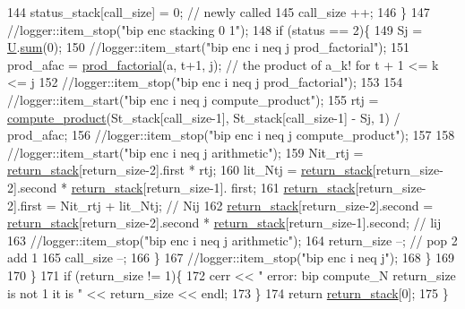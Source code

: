\begin{DoxyCode}
144         status\_stack[call\_size] = 0;  \textcolor{comment}{// newly called}
145         call\_size ++;
146       \}
147       \textcolor{comment}{//logger::item\_stop("bip enc stacking 0 1");}
148       \textcolor{keywordflow}{if} (status == 2)\{
149         Sj = \hyperlink{classb__graph__encoder_ac810138443002a2b2cf579ced2dc34ce}{U}.\hyperlink{classreverse__fenwick__tree_a672731fd6395b4853430073a099a80e6}{sum}(0);
150         \textcolor{comment}{//logger::item\_start("bip enc i neq j prod\_factorial");}
151         prod\_afac = \hyperlink{compression__helper_8cpp_a86d8a20e022dc06b23df3b08ac10b7d1}{prod\_factorial}(a, t+1, j); \textcolor{comment}{// the product of a\_k! for t + 1 <= k <= j}
152         \textcolor{comment}{//logger::item\_stop("bip enc i neq j prod\_factorial");}
153 
154         \textcolor{comment}{//logger::item\_start("bip enc i neq j compute\_product");}
155         rtj = \hyperlink{compression__helper_8cpp_ae2afb43aabe50f7d42aae8f82b5a35f4}{compute\_product}(St\_stack[call\_size-1], St\_stack[call\_size-1] - Sj, 1) / 
      prod\_afac;
156         \textcolor{comment}{//logger::item\_stop("bip enc i neq j compute\_product");}
157 
158         \textcolor{comment}{//logger::item\_start("bip enc i neq j arithmetic");}
159         Nit\_rtj = \hyperlink{namespacehelper__vars_a6d2100c373830cacd232319a9958652d}{return\_stack}[return\_size-2].first * rtj;
160         lit\_Ntj = \hyperlink{namespacehelper__vars_a6d2100c373830cacd232319a9958652d}{return\_stack}[return\_size-2].second * \hyperlink{namespacehelper__vars_a6d2100c373830cacd232319a9958652d}{return\_stack}[return\_size-1].
      first;
161         \hyperlink{namespacehelper__vars_a6d2100c373830cacd232319a9958652d}{return\_stack}[return\_size-2].first = Nit\_rtj + lit\_Ntj; \textcolor{comment}{// Nij}
162         \hyperlink{namespacehelper__vars_a6d2100c373830cacd232319a9958652d}{return\_stack}[return\_size-2].second = \hyperlink{namespacehelper__vars_a6d2100c373830cacd232319a9958652d}{return\_stack}[return\_size-2].second * 
      \hyperlink{namespacehelper__vars_a6d2100c373830cacd232319a9958652d}{return\_stack}[return\_size-1].second; \textcolor{comment}{// lij}
163         \textcolor{comment}{//logger::item\_stop("bip enc i neq j arithmetic");}
164         return\_size --; \textcolor{comment}{// pop 2 add 1}
165         call\_size --;
166       \}
167       \textcolor{comment}{//logger::item\_stop("bip enc i neq j");}
168     \}
169 
170   \}
171   \textcolor{keywordflow}{if} (return\_size != 1)\{
172     cerr << \textcolor{stringliteral}{" error: bip compute\_N return\_size is not 1 it is "} << return\_size << endl;
173   \}
174   \textcolor{keywordflow}{return} \hyperlink{namespacehelper__vars_a6d2100c373830cacd232319a9958652d}{return\_stack}[0];
175 \}
\end{DoxyCode}
\mbox{\label{classb__graph__encoder_aa2e816b095e96eecacdbf805d79db1af}} 
